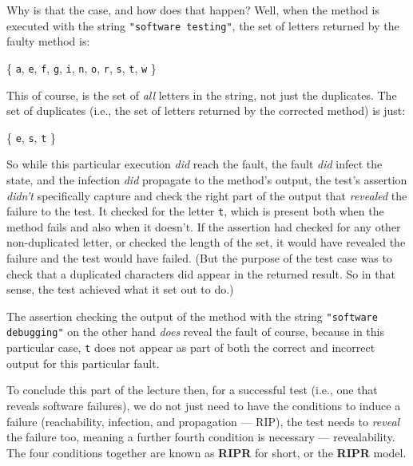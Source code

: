 Why is that the case, and how does that happen? Well, when the method is
executed with the string {\tt "software testing"}, the set of letters returned
by the faulty method is: 

\begin{center}
    \{ {\tt a}, {\tt e}, {\tt f}, {\tt g}, {\tt i}, {\tt n}, {\tt o}, {\tt r},
    {\tt s}, {\tt t}, {\tt w} \}
\end{center}

This of course, is the set of {\it all} letters in the string, not just the
duplicates. The set of duplicates (i.e., the set of letters returned by the
corrected method) is just:

\begin{center}
    \{ {\tt e}, {\tt s}, {\tt t} \}
\end{center}

So while this particular execution {\it did} reach the fault, the fault {\it
did} infect the state, and the infection {\it did} propagate to the method's
output, the test's assertion {\it didn't} specifically capture and check the
right part of the output that {\it revealed} the failure to the test. It checked
for the letter {\tt t}, which is present both when the method fails and also
when it doesn't. If the assertion had checked for any other non-duplicated
letter, or checked the length of the set, it would have revealed the failure and
the test would have failed. (But the purpose of the test case was to check that
a duplicated characters did appear in the returned result. So in that sense, the
test achieved what it set out to do.)

The assertion checking the output of the method with the string {\tt "software
debugging"} on the other hand {\it does} reveal the fault of course, because in
this particular case, {\tt t} does not appear as part of both the correct and
incorrect output for this particular fault. 


To conclude this part of the lecture then, for a successful test (i.e., one that
reveals software failures), we do not just need to have the conditions to induce
a failure (reachability, infection, and propagation --- RIP), the test needs to
{\it reveal} the failure too, meaning a further fourth condition is necessary
--- revealability. The four conditions together are known as {\bf RIPR} for
short, or the {\bf RIPR} model.

